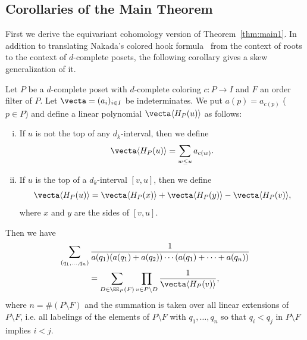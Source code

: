 
\subsection{%
Corollaries of the Main Theorem
}

First we derive the equivariant cohomology version of Theorem~\ref{thm:main1}.
In addition to translating Nakada's colored hook formula~\cite[Corollary~7.2]{N1} 
from the context of roots to the context of $d$-complete posets, 
the following corollary gives a skew generalization of it.

\begin{coro}
\label{cor:main2}
Let $P$ be a $d$-complete poset with $d$-complete coloring $c : P \to I$ 
and $F$ an order filter of $P$.
Let $\vecta = (a_i)_{i \in I}$ be indeterminates.
We put $a(p) = a_{c(p)}$ \textup{(}$p \in P$\textup{)} 
and define a linear polynomial $\vecta \langle H_P(u) \rangle$ 
as follows:
\begin{enumerate}[(i)]
\item\label{coro5.4_i} %
If $u$ is not the top of any $d_k$-interval, then we define
$$
\vecta \langle H_P(u) \rangle = \sum_{w \le u} a_{c(w)}.
$$
\item\label{coro5.4_ii} %
If $u$ is the top of a $d_k$-interval $[v,u]$, then we define
$$
\vecta \langle H_P(u) \rangle
 =
\vecta \langle H_P(x) \rangle + \vecta \langle H_P(y) \rangle
- \vecta \langle H_P(v) \rangle,
$$
where $x$ and $y$ are the sides of $[v,u]$.
\end{enumerate}
Then we have
\begin{multline}
\label{eq:main2}
\sum_{(q_1, \dots, q_n)}
 \frac{ 1 }
 { a(q_1) (a(q_1)+a(q_2)) \cdots (a(q_1)+\dots+a(q_n)) }
\\
 =
\sum_{D \in \EE_P(F)}
 \prod_{v \in P \setminus D}
 \frac{ 1 }
 { \vecta \langle H_P(v) \rangle },
\end{multline}
where $n = \# (P\setminus F)$ and 
the summation is taken over all linear extensions of $P \setminus F$, 
i.e. all labelings of the elements of $P \setminus F$ with $q_1, \dots, q_n$ so that 
 $q_i < q_j$ in $P \setminus F$ implies $i < j$.
\end{coro}

